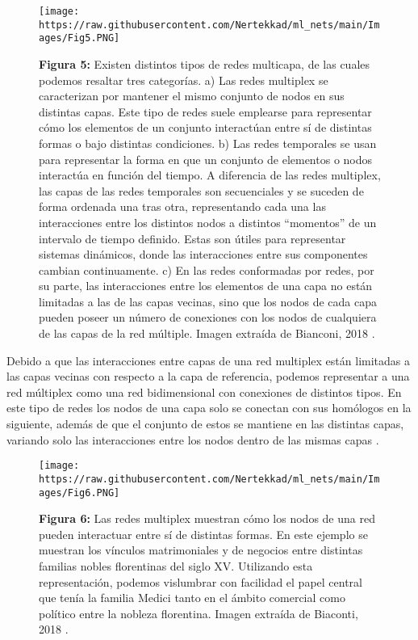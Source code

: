 \documentclass[
]{book}
\begin{document}
\begin{figure}
\centering
\texttt{[image: https://raw.githubusercontent.com/Nertekkad/ml\_nets/main/Images/Fig5.PNG]}
\caption{\textbf{Figura 5:} Existen distintos tipos de redes multicapa, de las cuales podemos resaltar tres categorías. a) Las redes multiplex se caracterizan por mantener el mismo conjunto de nodos en sus distintas capas. Este tipo de redes suele emplearse para representar cómo los elementos de un conjunto interactúan entre sí de distintas formas o bajo distintas condiciones. b) Las redes temporales se usan para representar la forma en que un conjunto de elementos o nodos interactúa en función del tiempo. A diferencia de las redes multiplex, las capas de las redes temporales son secuenciales y se suceden de forma ordenada una tras otra, representando cada una las interacciones entre los distintos nodos a distintos ``momentos'' de un intervalo de tiempo definido. Estas son útiles para representar sistemas dinámicos, donde las interacciones entre sus componentes cambian continuamente. c) En las redes conformadas por redes, por su parte, las interacciones entre los elementos de una capa no están limitadas a las de las capas vecinas, sino que los nodos de cada capa pueden poseer un número de conexiones con los nodos de cualquiera de las capas de la red múltiple. Imagen extraída de Bianconi, 2018 \citep{bianconi2018multilayer}.}
\end{figure}

Debido a que las interacciones entre capas de una red multiplex están limitadas a las capas vecinas con respecto a la capa de referencia, podemos representar a una red múltiplex como una red bidimensional con conexiones de distintos tipos. En este tipo de redes los nodos de una capa solo se conectan con sus homólogos en la siguiente, además de que el conjunto de estos se mantiene en las distintas capas, variando solo las interacciones entre los nodos dentro de las mismas capas \citep{kanawati2015multiplex}.

\begin{figure}
\centering
\texttt{[image: https://raw.githubusercontent.com/Nertekkad/ml\_nets/main/Images/Fig6.PNG]}
\caption{\textbf{Figura 6:} Las redes multiplex muestran cómo los nodos de una red pueden interactuar entre sí de distintas formas. En este ejemplo se muestran los vínculos matrimoniales y de negocios entre distintas familias nobles florentinas del siglo XV. Utilizando esta representación, podemos vislumbrar con facilidad el papel central que tenía la familia Medici tanto en el ámbito comercial como político entre la nobleza florentina. Imagen extraída de Biaconti, 2018 \citep{padgett1993robust}.}
\end{figure}
\end{document}
